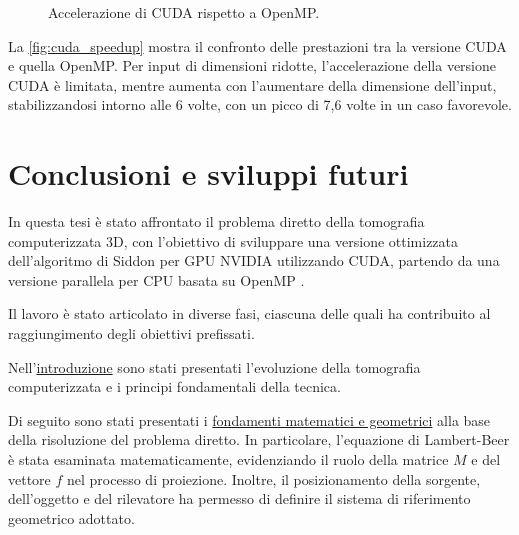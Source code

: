 \documentclass[12pt,a4paper]{report}
\begin{document}
\begin{figure}[H]
  \centering
    \caption{\label{fig:cuda_speedup} Accelerazione di CUDA rispetto a OpenMP.}
\end{figure}

La \autoref{fig:cuda_speedup} mostra il confronto delle prestazioni tra la versione CUDA e quella OpenMP.
Per input di dimensioni ridotte, l'accelerazione della versione CUDA è limitata, mentre aumenta con l'aumentare della dimensione
dell'input, stabilizzandosi intorno alle 6 volte, con un picco di 7,6 volte in un caso favorevole.

\chapter{Conclusioni e sviluppi futuri} \label{chap:conc}

In questa tesi è stato affrontato il problema diretto della tomografia computerizzata 3D, con l'obiettivo di sviluppare
una versione ottimizzata dell'algoritmo di Siddon \cite{Siddon1984} per GPU NVIDIA utilizzando CUDA, partendo da una versione
parallela per CPU basata su OpenMP \cite{Colletta2024}.

Il lavoro è stato articolato in diverse fasi, ciascuna delle quali ha contribuito al raggiungimento degli obiettivi prefissati.

Nell'\hyperref[chap:intro]{introduzione} sono stati presentati l'evoluzione della tomografia computerizzata e i principi
fondamentali della tecnica.

Di seguito sono stati presentati i \hyperref[chap:math]{fondamenti matematici e geometrici} alla base della risoluzione del
problema diretto.
In particolare, l'equazione di Lambert-Beer è stata esaminata matematicamente, evidenziando il ruolo della matrice \(M\) e del
vettore \(f\) nel processo di proiezione.
Inoltre, il posizionamento della sorgente, dell'oggetto e del rilevatore ha permesso di definire il sistema di riferimento
geometrico adottato.
\end{document}
